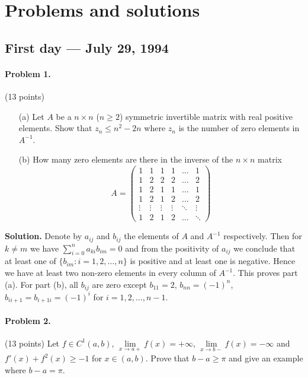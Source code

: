 \documentclass{article}
\begin{document}
\pagestyle{plain}

\section*{Problems and solutions}

\subsection*{First day — July 29, 1994}

\paragraph{Problem 1.} (13 points)
\begin{enumerate}
    \item[(a)] Let $A$ be a $n \times n$ ($n \geq 2$) symmetric invertible matrix with real positive elements. Show that $z_n \leq n^2 - 2n$ where $z_n$ is the number of zero elements in $A^{-1}$.
    \item[(b)] How many zero elements are there in the inverse of the $n \times n$ matrix
    \[
    A = \begin{pmatrix}
    1 & 1 & 1 & 1 & \dots & 1 \\
    1 & 2 & 2 & 2 & \dots & 2 \\
    1 & 2 & 1 & 1 & \dots & 1 \\
    1 & 2 & 1 & 2 & \dots & 2 \\
    \vdots & \vdots & \vdots & \vdots & \ddots & \vdots \\
    1 & 2 & 1 & 2 & \dots & \ddots
    \end{pmatrix}
    \]
\end{enumerate}
\textbf{Solution.} Denote by $a_{ij}$ and $b_{ij}$ the elements of $A$ and $A^{-1}$ respectively. Then for $k \neq m$ we have $\sum_{i=0}^n a_{ki} b_{im} = 0$ and from the positivity of $a_{ij}$ we conclude that at least one of $\{b_{im} : i = 1, 2, \ldots, n\}$ is positive and at least one is negative. Hence we have at least two non-zero elements in every column of $A^{-1}$. This proves part (a). For part (b), all $b_{ij}$ are zero except $b_{11} = 2$, $b_{nn} = (-1)^n$, $b_{ii+1} = b_{i+1i} = (-1)^i$ for $i = 1, 2, \ldots, n - 1$.

\paragraph{Problem 2.} (13 points)
Let $f \in C^1(a, b)$, $\lim\limits_{x \to a+} f(x) = +\infty$,
$\lim\limits_{x \to b-} f(x) = -\infty$
and $f'(x) + f^2(x) \geq -1$ for $x \in (a, b)$. Prove that $b - a \geq \pi$ and give an example where $b - a = \pi$.
\end{document}
